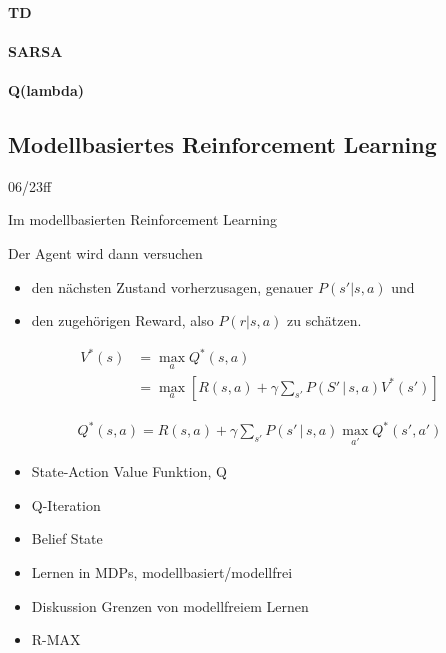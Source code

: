 \documentclass[ngerman]{../LaTeX-Templates/Paper/paper}
\begin{document}
\paragraph{TD}
\paragraph{SARSA}
\paragraph{Q(lambda)}






\subsection{Modellbasiertes Reinforcement Learning}
06/23ff




Im modellbasierten Reinforcement Learning 

Der Agent wird dann versuchen
\begin{itemize}
	\item den nächsten Zustand vorherzusagen, genauer $P(s'|s,a)$ und
	\item den zugehörigen Reward, also $P(r|s,a)$ zu schätzen.
\end{itemize}








\begin{align}\label{Bellman1}
	V^\ast(s)&=\max_aQ^\ast(s,a)\\
	&=\max_a\left[R(s,a)+\gamma\sum_{s'}P(S'\,|\, s,a)V^\ast(s')\right]\nonumber
\end{align}


\begin{align}\label{Bellman2}
	Q^\ast(s,a)=R(s,a)+\gamma\sum_{s'}P(s'\,|\,s,a)\max_{a'}Q^\ast (s',a')
\end{align}

\begin{itemize}
	\item State-Action Value Funktion, Q
	\item Q-Iteration
	\item Belief State
	\item Lernen in MDPs, modellbasiert/modellfrei
	\item Diskussion Grenzen von modellfreiem Lernen 
	\item R-MAX
\end{itemize}
\end{document}
